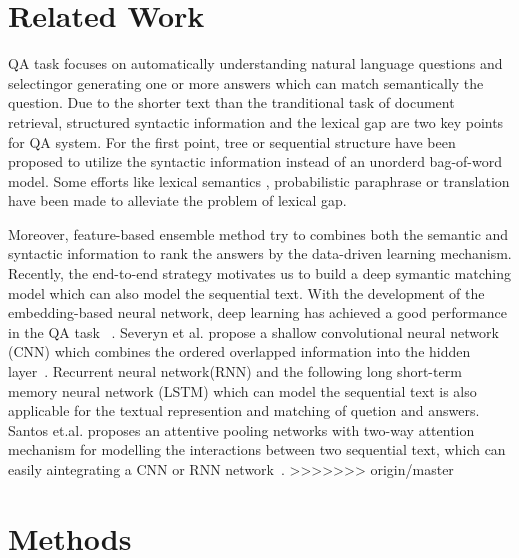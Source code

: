 \documentclass{llncs}
\begin{document}
\section{Related Work}
\label{sec:relatedword}
QA task focuses on automatically understanding natural language questions and selectingor generating one or more answers which can match semantically the question. %
Due to the shorter text than the tranditional task of document retrieval, structured  syntactic information and  the lexical gap are two key points for QA system. 
For the first point, tree \cite{Yao2013Answer} or sequential \cite{Wang2015FAQ} structure have been proposed to utilize the syntactic information instead of an  unorderd bag-of-word model.
Some efforts like lexical semantics \cite{Yih2013Question}, probabilistic paraphrase or translation \cite{Zhou2011Phrase} have been made to alleviate the problem of lexical gap.

Moreover, feature-based ensemble method \cite{Severyn2013Automatic} try to combines both the semantic and syntactic information to rank the answers by the data-driven learning mechanism. Recently, the end-to-end strategy motivates us to build a deep symantic matching model which can also model the sequential text. With the development of the embedding-based neural network, deep learning has achieved a good performance in the QA task~ \cite{Yu2014Deep} \cite{Feng2015Applying}. Severyn et al. propose a shallow convolutional neural network (CNN) which combines the ordered overlapped information into the hidden layer~\cite{severyn2015learning}. Recurrent neural network(RNN) and the following long short-term memory neural network (LSTM) \cite{Wang2015A} \cite{Tan2015LSTM} which can model the sequential text is also applicable for the textual represention and matching of quetion and answers. Santos et.al. proposes an attentive pooling networks with two-way attention mechanism for modelling the interactions between two sequential text, which can easily aintegrating a CNN or RNN network~\cite{Santos2016Attentive}. 
>>>>>>> origin/master



\section{Methods}
\label{sec:methods}
\end{document}
